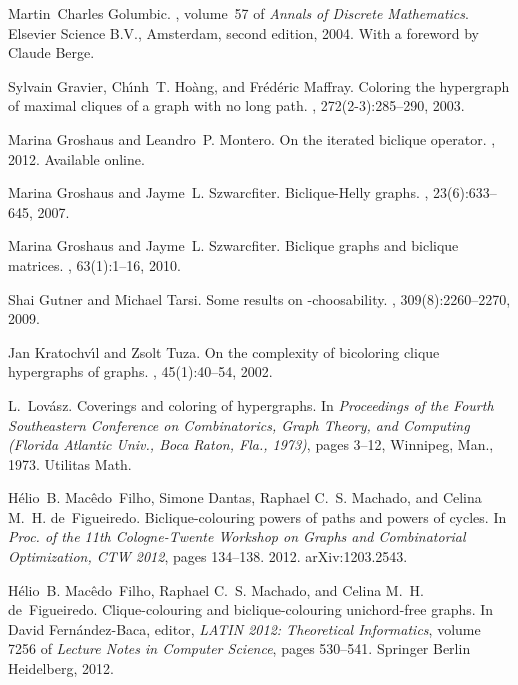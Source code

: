 \documentclass[a4paper, 11pt, oneside]{article}
\begin{document}
\begin{thebibliography}{10}
Martin~Charles Golumbic.
, volume~57 of {\em
  Annals of Discrete Mathematics}.
\newblock Elsevier Science B.V., Amsterdam, second edition, 2004.
\newblock With a foreword by Claude Berge.

Sylvain Gravier, Ch{\'{\i}}nh~T. Ho{\`a}ng, and Fr{\'e}d{\'e}ric Maffray.
\newblock Coloring the hypergraph of maximal cliques of a graph with no long
  path.
, 272(2-3):285--290, 2003.

Marina Groshaus and Leandro~P. Montero.
\newblock On the iterated biclique operator.
, 2012.
\newblock Available online.

Marina Groshaus and Jayme~L. Szwarcfiter.
\newblock Biclique-{H}elly graphs.
, 23(6):633--645, 2007.

Marina Groshaus and Jayme~L. Szwarcfiter.
\newblock Biclique graphs and biclique matrices.
, 63(1):1--16, 2010.

Shai Gutner and Michael Tarsi.
\newblock Some results on {}-choosability.
, 309(8):2260--2270, 2009.

Jan Kratochv{\'{\i}}l and Zsolt Tuza.
\newblock On the complexity of bicoloring clique hypergraphs of graphs.
, 45(1):40--54, 2002.

L.~Lov{\'a}sz.
\newblock Coverings and coloring of hypergraphs.
\newblock In {\em Proceedings of the {F}ourth {S}outheastern {C}onference on
  {C}ombinatorics, {G}raph {T}heory, and {C}omputing ({F}lorida {A}tlantic
  {U}niv., {B}oca {R}aton, {F}la., 1973)}, pages 3--12, Winnipeg, Man., 1973.
  Utilitas Math.

H\'elio~B. Mac\^edo~Filho, Simone Dantas, Raphael C.~S. Machado, and Celina
  M.~H. de~Figueiredo.
\newblock Biclique-colouring powers of paths and powers of cycles.
\newblock In {\em Proc. of the 11th Cologne-Twente Workshop on Graphs and
  Combinatorial Optimization, CTW 2012}, pages 134--138. 2012.
\newblock arXiv:1203.2543.

H\'elio~B. Mac\^edo~Filho, Raphael C.~S. Machado, and Celina M.~H.
  de~Figueiredo.
\newblock Clique-colouring and biclique-colouring unichord-free graphs.
\newblock In David Fern\'andez-Baca, editor, {\em LATIN 2012: Theoretical
  Informatics}, volume 7256 of {\em Lecture Notes in Computer Science}, pages
  530--541. Springer Berlin Heidelberg, 2012.


\end{thebibliography}
\end{document}
